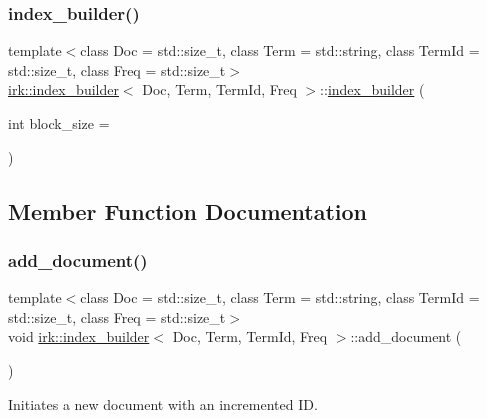 \subsubsection{\texorpdfstring{index\+\_\+builder()}{index\_builder()}}
{\footnotesize\ttfamily template$<$class Doc  = std\+::size\+\_\+t, class Term  = std\+::string, class Term\+Id  = std\+::size\+\_\+t, class Freq  = std\+::size\+\_\+t$>$ \\
\mbox{\hyperlink{classirk_1_1index__builder}{irk\+::index\+\_\+builder}}$<$ Doc, Term, Term\+Id, Freq $>$\+::\mbox{\hyperlink{classirk_1_1index__builder}{index\+\_\+builder}} (\begin{DoxyParamCaption}\item[{int}]{block\+\_\+size = {} }\end{DoxyParamCaption})\hspace{0.3cm}{\ttfamily [inline]}}



\subsection{Member Function Documentation}
\mbox{\label{classirk_1_1index__builder_a005813bfb531005ce2ca54a9f7cfd261}} 
\subsubsection{\texorpdfstring{add\+\_\+document()}{add\_document()}\hspace{0.1cm}{\footnotesize\ttfamily [1/2]}}
{\footnotesize\ttfamily template$<$class Doc  = std\+::size\+\_\+t, class Term  = std\+::string, class Term\+Id  = std\+::size\+\_\+t, class Freq  = std\+::size\+\_\+t$>$ \\
void \mbox{\hyperlink{classirk_1_1index__builder}{irk\+::index\+\_\+builder}}$<$ Doc, Term, Term\+Id, Freq $>$\+::add\+\_\+document (\begin{DoxyParamCaption}{ }\end{DoxyParamCaption})\hspace{0.3cm}{\ttfamily [inline]}}



Initiates a new document with an incremented ID. 

\mbox{\label{classirk_1_1index__builder_ac7c266fbf628b828059ac89b6f6ad1cc}} 
